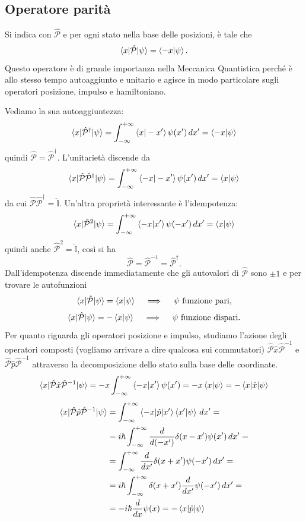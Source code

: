 \subsection{Operatore parità}
Si indica con \( \hat{\mathcal{P}} \) e per ogni stato nella base delle posizioni, è tale che
\[
\braket{x|\hat{\mathcal{P}}|\psi} = \braket{-x|\psi}.
\]
Questo operatore è di grande importanza nella Meccanica Quantistica perché è allo stesso tempo autoaggiunto e unitario e agisce in modo particolare sugli operatori posizione, impulso e hamiltoniano.

\bigskip
\noindent
Vediamo la sua autoaggiuntezza:
\[
\braket{x|\hat{\mathcal{P}}^\dag|\psi} = \int_{-\infty}^{+\infty} \braket{x|-x'} \psi(x') \, dx' = \braket{-x|\psi}
\]
quindi \( \hat{\mathcal{P}} = \hat{\mathcal{P}}^\dag \). L'unitarietà discende da 
\[
\braket{x|\hat{\mathcal{P}}\hat{\mathcal{P}}^\dag|\psi} = \int_{-\infty}^{+\infty} \braket{-x|-x'} \psi(x') \, dx' = \braket{x|\psi}
\]
da cui \( \hat{\mathcal{P}}\hat{\mathcal{P}}^\dag = \hat{\mathbb{I}} \). Un'altra proprietà interessante è l'idempotenza:
\[
\braket{x|\hat{\mathcal{P}}^2|\psi} = \int_{-\infty}^{+\infty} \braket{-x|x'} \psi(-x') \, dx' = \braket{x|\psi}
\]
quindi anche \( \hat{\mathcal{P}}^2 = \hat{\mathbb{I}} \), così si ha
\[
\hat{\mathcal{P}} = \hat{\mathcal{P}}^{-1} = \hat{\mathcal{P}}^\dag.
\]
Dall'idempotenza discende immediatamente che gli autovalori di \( \hat{\mathcal{P}} \) sono \( \pm 1 \) e per trovare le autofunzioni
\[
\braket{x|\hat{\mathcal{P}}|\psi} = \braket{x|\psi} \quad \implies \quad \psi \text{ funzione pari},
\]
\[
\braket{x|\hat{\mathcal{P}}|\psi} = -\braket{x|\psi} \quad \implies \quad \psi \text{ funzione dispari}.
\]
Per quanto riguarda gli operatori posizione e impulso, studiamo l'azione degli operatori composti (vogliamo arrivare a dire qualcosa sui commutatori) \( \hat{\mathcal{P}} \hat{x} \hat{\mathcal{P}}^{-1} \) e \( \hat{\mathcal{P}} \hat{p} \hat{\mathcal{P}}^{-1} \) attraverso la decomposizione dello stato sulla base delle coordinate.
\[
\braket{x|\hat{\mathcal{P}} \hat{x} \hat{\mathcal{P}}^{-1}|\psi} = -x \int_{-\infty}^{+\infty} \braket{-x|x'} \psi(x') = -x \braket{x|\psi} = - \braket{x|\hat{x}|\psi}
\]
\begin{align*}
\braket{x|\hat{\mathcal{P}} \hat{p} \hat{\mathcal{P}}^{-1}|\psi} &= \int_{-\infty}^{+\infty} \braket{-x|\hat{p}|x'} \braket{x'|\psi} \, dx' = \\
&= i \hbar \int_{-\infty}^{+\infty} \frac{d}{d(-x')} \delta(x - x') \psi(x') \, dx' = \\
&= \int_{-\infty}^{+\infty} \frac{d}{dx'} \delta(x + x') \psi(-x') \, dx' = \\
&= i \hbar \int_{-\infty}^{+\infty} \delta(x + x') \frac{d}{dx'} \psi(-x') \, dx' = \\
&= -i \hbar \frac{d}{dx} \psi(x) = -\braket{x|\hat{p}|\psi}
\end{align*}
